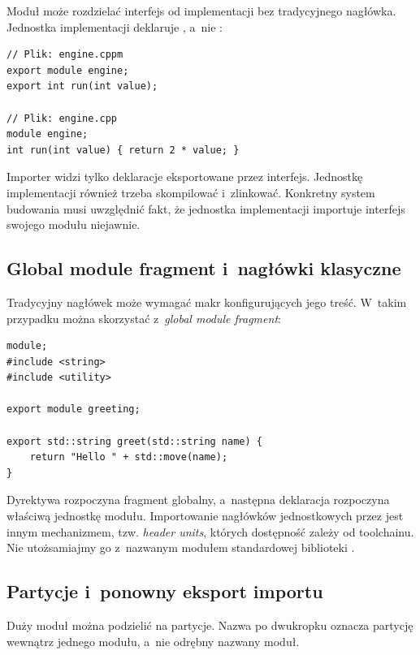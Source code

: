 Moduł może rozdzielać interfejs od implementacji bez tradycyjnego
nagłówka. Jednostka implementacji deklaruje ,
a~nie :

\begin{lstlisting}[caption={Dwa pliki jednego modułu: engine.cppm i engine.cpp.}]
// Plik: engine.cppm
export module engine;
export int run(int value);

// Plik: engine.cpp
module engine;
int run(int value) { return 2 * value; }
\end{lstlisting}

Importer widzi tylko deklaracje eksportowane przez interfejs.
Jednostkę implementacji również trzeba skompilować i~zlinkować.
Konkretny system budowania musi uwzględnić fakt, że jednostka
implementacji importuje interfejs swojego modułu niejawnie.

\subsection{Global module fragment i~nagłówki klasyczne}

Tradycyjny nagłówek może wymagać makr konfigurujących jego treść.
W~takim przypadku można skorzystać z~\emph{global module fragment}:

\begin{lstlisting}[caption={Global module fragment: tradycyjny include przed modułem.}]
module;
#include <string>
#include <utility>

export module greeting;

export std::string greet(std::string name) {
    return "Hello " + std::move(name);
}
\end{lstlisting}

Dyrektywa  rozpoczyna fragment globalny, a~następna
deklaracja  rozpoczyna właściwą
jednostkę modułu. Importowanie nagłówków jednostkowych przez
 jest innym mechanizmem, tzw. \emph{header units},
których dostępność zależy od toolchainu. Nie utożsamiajmy go z~nazwanym
modułem standardowej biblioteki .

\subsection{Partycje i~ponowny eksport importu}

Duży moduł można podzielić na partycje. Nazwa po dwukropku oznacza
partycję wewnątrz jednego modułu, a~nie odrębny nazwany moduł.

